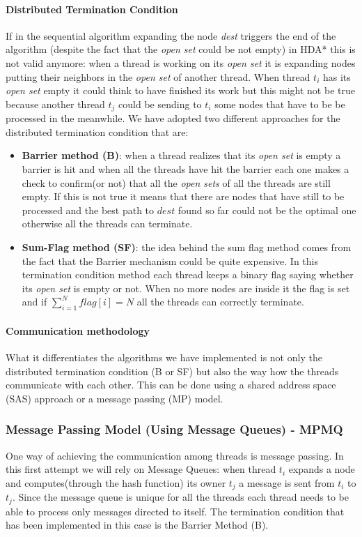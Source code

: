 \documentclass[twocolumn, switch]{article} %
\begin{document}
\paragraph{Distributed Termination Condition}
If in the sequential algorithm expanding the node \textit{dest} triggers the end of the algorithm (despite
the fact that the \textit{open set} could be not empty) in HDA* this is not valid anymore: when a thread
is working on its \textit{open set} it is expanding nodes putting their neighbors in the
\textit{open set} of another thread. When thread $t_i$ has its \textit{open set} empty it could think
to have finished its work but this might not be true because another thread $t_j$ could be sending
to $t_i$ some nodes that have to be be processed in the meanwhile. We have adopted two
different approaches for the distributed termination condition that are:
\begin{itemize}
  \item \textbf{Barrier method (B)}: when a thread realizes that its \textit{open set} is
        empty a barrier is 
        hit and when all the threads have hit the barrier
        each one makes a check to confirm(or not) that all the \textit{open sets} of all
        the threads are still empty. If this is not true it means that there are nodes
        that have still to be processed and the best path to $dest$ found so far could
        not be the optimal one otherwise all the threads can terminate.
  \item \textbf{Sum-Flag method (SF)}: the idea behind the sum flag method comes from the fact that
        the Barrier mechanism could be quite expensive. In this termination condition method
        each thread keeps a binary flag saying whether its \textit{open set} is empty
        or not. When no more nodes are inside it the flag is set and if $\sum_{i=1}^{N}flag[i] = N$
        all the threads can correctly terminate.
\end{itemize}
\paragraph{Communication methodology}
What it differentiates the algorithms we have implemented is not only
the distributed termination condition (B or SF) but also the way how the threads
communicate with each other. This can be done using a shared address space (SAS) approach or a message passing (MP) model.
\subsubsection{Message Passing Model (Using Message Queues) - MPMQ}
One way of achieving the communication among threads is message passing. In this first attempt we will rely
on Message Queues: when thread $t_i$ expands a node and computes(through the hash function) 
its owner $t_j$ a message is sent from $t_i$ to $t_j$. Since the message
queue is unique for all the threads each thread needs to be able to process
only messages directed to itself.  The termination condition that has been implemented in this case is the Barrier Method (B).
\end{document}
